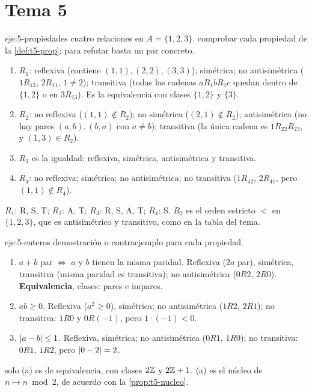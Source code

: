 \section{Tema 5}

\begin{solucion}{eje:5-propiedades}
\datos cuatro relaciones en $A=\{1,2,3\}$.
\planteamiento comprobar cada propiedad de la \cref{def:t5-prop}; para refutar basta un par concreto.
\pasos
\begin{enumerate}[label=\arabic*.]
  \item $R_1$: reflexiva (contiene $(1,1),(2,2),(3,3)$); simétrica; no antisimétrica ($1R_12$, $2R_11$, $1\neq2$); transitiva (todas las cadenas $aR_1bR_1c$ quedan dentro de $\{1,2\}$ o en $3R_13$). Es la equivalencia con clases $\{1,2\}$ y $\{3\}$.
  \item $R_2$: no reflexiva ($(1,1)\notin R_2$); no simétrica ($(2,1)\notin R_2$); antisimétrica (no hay pares $(a,b),(b,a)$ con $a\neq b$); transitiva (la única cadena es $1R_22R_23$, y $(1,3)\in R_2$).
  \item $R_3$ es la igualdad: reflexiva, simétrica, antisimétrica y transitiva.
  \item $R_4$: no reflexiva; simétrica; no antisimétrica; no transitiva ($1R_42$, $2R_41$, pero $(1,1)\notin R_4$).
\end{enumerate}
\resultado $R_1$: R, S, T; $R_2$: A, T; $R_3$: R, S, A, T; $R_4$: S.
\comprobacion $R_2$ es el orden estricto $<$ en $\{1,2,3\}$, que es antisimétrico y transitivo, como en la tabla del tema.
\end{solucion}

\begin{solucion}{eje:5-enteros}
\planteamiento demostración o contraejemplo para cada propiedad.
\pasos
\begin{enumerate}[label=(\alph*)]
  \item $a+b$ par $\iff$ $a$ y $b$ tienen la misma paridad. Reflexiva ($2a$ par), simétrica, transitiva (misma paridad es transitiva); no antisimétrica ($0R2$, $2R0$). \textbf{Equivalencia}, clases: pares e impares.
  \item $ab\ge0$. Reflexiva ($a^{2}\ge0$), simétrica; no antisimétrica ($1R2$, $2R1$); no transitiva: $1R0$ y $0R(-1)$, pero $1\cdot(-1)<0$.
  \item $\lvert a-b\rvert\le1$. Reflexiva, simétrica; no antisimétrica ($0R1$, $1R0$); no transitiva: $0R1$, $1R2$, pero $\lvert0-2\rvert=2$.
\end{enumerate}
\resultado solo (a) es de equivalencia, con clases $2\mathbb{Z}$ y $2\mathbb{Z}+1$.
\comprobacion (a) es el núcleo de $n\mapsto n\bmod2$, de acuerdo con la \cref{prop:t5-nucleo}.
\end{solucion}

